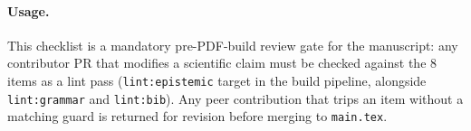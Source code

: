 \paragraph*{Usage.} This checklist is a mandatory pre-PDF-build review gate for the manuscript: any contributor PR that modifies a scientific claim must be checked against the 8 items as a lint pass (\texttt{lint:epistemic} target in the build pipeline, alongside \texttt{lint:grammar} and \texttt{lint:bib}). Any peer contribution that trips an item without a matching guard is returned for revision before merging to \texttt{main.tex}.
